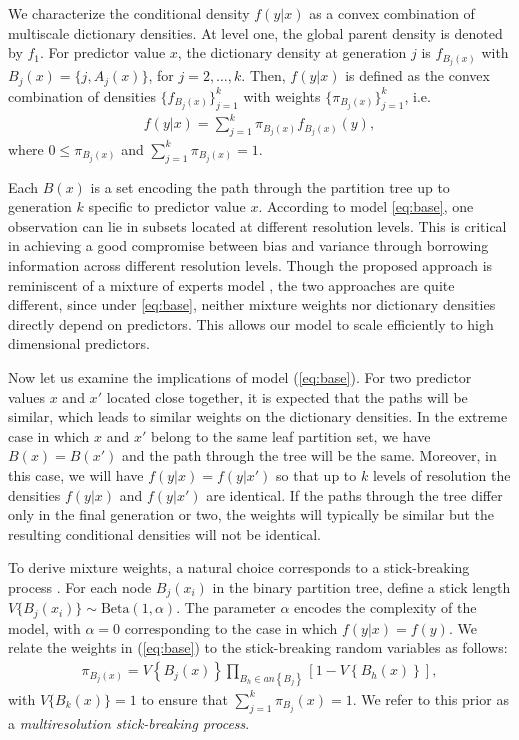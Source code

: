 \documentclass{article}
\begin{document}
We characterize the conditional density $f(y|x)$ as a convex combination of multiscale dictionary densities.  At level one, the global parent density is denoted by $f_1$. For predictor value $x$, the dictionary density at generation $j$ is $f_{B_j(x)}$ with $B_j(x)=\{j,A_j(x)\}$, for $j=2,\ldots, k$. Then, $f(y|x)$ is defined as the convex combination of densities $\{f_{B_j(x)}\}_{j=1}^k$ with weights $\{\pi_{B_j(x)} \}_{j=1}^k$, i.e.
\begin{eqnarray}
f(y|x) = \sum_{j=1}^k \pi_{B_j(x)} f_{B_j(x)}(y),  \label{eq:base}
\end{eqnarray}
where $0 \le \pi_{B_j(x)}$ and $\sum_{j=1}^k \pi_{B_j(x)}=1$. 

Each $B(x)$ is a set encoding the path through the partition tree up to generation $k$ specific to predictor value $x$. According to model \eqref{eq:base}, one observation can lie in subsets located at different resolution levels. This is critical in achieving a good compromise between bias and variance through borrowing information across different resolution levels. Though the proposed approach is reminiscent of a mixture of experts model \cite{mixtureexperts}, the two approaches are quite different, since under \eqref{eq:base}, neither mixture weights nor dictionary densities directly depend on predictors. This allows our model to scale efficiently to high dimensional predictors.

Now let us examine the implications of model (\ref{eq:base}). For two predictor values $x$ and $x'$ located close together, it is expected that the paths will be similar, which leads to similar weights on the dictionary densities.  In the extreme case in which $x$ and $x'$ belong to the same leaf partition set, we have $B(x) = B(x')$ and the path through the tree will be the same.  Moreover, in this case, we will have $f(y|x)=f(y|x')$ so that up to $k$ levels of resolution the densities $f(y|x)$ and $f(y|x')$ are identical.  If the paths through the tree differ only in the final generation or two, the weights will typically be similar but the resulting conditional densities will not be identical. 

To derive mixture weights, a natural choice corresponds to a stick-breaking process \cite{stickbreaking}.  For each node $B_j(x_i)$ in the binary partition tree, define a stick length $V\{B_j(x_i)\} \sim \mbox{Beta}(1,\alpha)$.  The parameter $\alpha$ encodes the complexity of the model, with $\alpha=0$ corresponding to the case in which $f(y|x) = f(y)$.  We relate the weights in (\ref{eq:base}) to the stick-breaking random variables as follows: 
\begin{eqnarray*}
\pi_{B_j(x)} = V\left\{B_j(x)\right\} \prod_{B_h \in an\left\{B_j\right\}} \left[1 - V\left\{B_h(x)\right\}\right],
\end{eqnarray*}
with $V\{B_k(x)\}=1$ to ensure that $\sum_{j=1}^k \pi_{B_j}(x) = 1$.   We refer to this prior as a {\em multiresolution stick-breaking process}.   
\vskip 12pt
\end{document}
